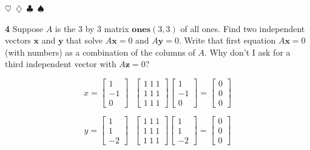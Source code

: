\documentclass{article}
\newcommand{\sep}{\begin{center}$\heartsuit$~$\diamondsuit$~$\clubsuit$~$\spadesuit$\end{center}}
\newcommand{\vect}[1]{\ensuremath{\boldsymbol{#1}}}
\begin{document}
\sep

\noindent\textbf{4} Suppose $A$ is the 3 by 3 matrix $\mathbf{ones}(3, 3)$ of all ones. Find two independent vectors $\vect{x}$ and $\vect{y}$ that solve $A\vect{x} = 0$ and $A\vect{y} = 0$. Write that first equation $A\vect{x} = 0$ (with numbers) as a combination of the columns of $A$. Why don't I ask for a third independent vector with $A\vect{z} = 0$? 

\begin{displaymath}
  x = \begin{bmatrix} 1 \\ -1 \\ 0 \end{bmatrix}
  ~~~
  \begin{bmatrix} 1 ~ 1 ~ 1 \\ 1 ~ 1 ~ 1 \\ 1 ~ 1 ~ 1 \end{bmatrix} \begin{bmatrix} 1 \\ -1 \\ 0 \end{bmatrix} = \begin{bmatrix} 0 \\ 0 \\ 0 \end{bmatrix}
\end{displaymath}

\begin{displaymath}
  y = \begin{bmatrix} 1 \\ 1 \\ -2 \end{bmatrix}
  ~~~
  \begin{bmatrix} 1 ~ 1 ~ 1 \\ 1 ~ 1 ~ 1 \\ 1 ~ 1 ~ 1 \end{bmatrix} \begin{bmatrix} 1 \\ 1 \\ -2 \end{bmatrix} = \begin{bmatrix} 0 \\ 0 \\ 0 \end{bmatrix}
\end{displaymath}
\end{document}
